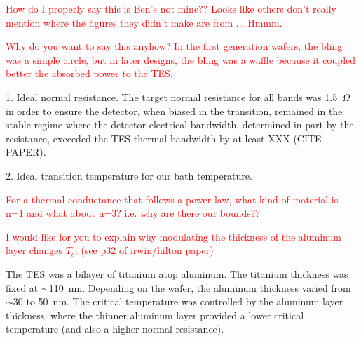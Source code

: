 \textcolor{red}{How do I properly say this is Ben's not mine?? Looks like others don't really mention where the figures they didn't make are from ... Hmmm.}

\textcolor{red}{Why do you want to say this anyhow? In the first generation wafers, the bling was a simple circle, but in later designs, the bling was a waffle because it coupled better the absorbed power to the \ac{TES}.}



1. Ideal normal resistance.  
The target normal resistance for all bands was 1.5~$\Omega$ in order to ensure the detector, when biased in the transition, remained in the stable regime where the detector electrical bandwidth, determined in part by the resistance, exceeded the \ac{TES} thermal bandwidth by at least XXX (CITE PAPER). 

2. Ideal transition temperature for our bath temperature. 


\textcolor{red}{For a thermal conductance that follows a power law, what kind of material is n=1 and what about n=3? i.e. why are there our bounds??}

\textcolor{red}{I would like for you to explain why modulating the thickness of the aluminum layer changes $T_{c}$. (see p32 of irwin/hilton paper)}


The \ac{TES} was a bilayer of titanium atop aluminum. 
The titanium thickness was fixed at $\sim$110~nm. 
Depending on the wafer, the aluminum thickness varied from $\sim$30 to 50~nm. 
The critical temperature was controlled by the aluminum layer thickness, where the thinner aluminum layer provided a lower critical temperature (and also a higher normal resistance). 

